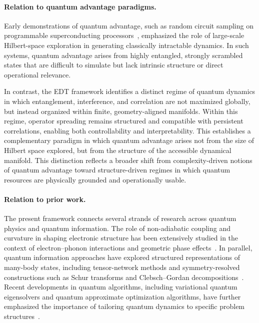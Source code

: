 \documentclass[twocolumn,10pt]{article}
\begin{document}
\paragraph*{Relation to quantum advantage paradigms.}

Early demonstrations of quantum advantage, such as random circuit sampling on programmable superconducting processors~\cite{Arute2019}, emphasized the role of large-scale Hilbert-space exploration in generating classically intractable dynamics. In such systems, quantum advantage arises from highly entangled, strongly scrambled states that are difficult to simulate but lack intrinsic structure or direct operational relevance.

In contrast, the EDT framework identifies a distinct regime of quantum dynamics in which entanglement, interference, and correlation are not maximized globally, but instead organized within finite, geometry-aligned manifolds. Within this regime, operator spreading remains structured and compatible with persistent correlations, enabling both controllability and interpretability. This establishes a complementary paradigm in which quantum advantage arises not from the size of Hilbert space explored, but from the structure of the accessible dynamical manifold. This distinction reflects a broader shift from complexity-driven notions of quantum advantage toward structure-driven regimes in which quantum resources are physically grounded and operationally usable.

\paragraph*{Relation to prior work.}

The present framework connects several strands of research across quantum physics and quantum information. The role of non-adiabatic coupling and curvature in shaping electronic structure has been extensively studied in the context of electron--phonon interactions and geometric phase effects~\cite{Mead1979,Yarkony1996,Giustino2017}. In parallel, quantum information approaches have explored structured representations of many-body states, including tensor-network methods and symmetry-resolved constructions such as Schur transforms and Clebsch--Gordan decompositions~\cite{Schollwock2011,Bacon2006}. Recent developments in quantum algorithms, including variational quantum eigensolvers and quantum approximate optimization algorithms, have further emphasized the importance of tailoring quantum dynamics to specific problem structures~\cite{Peruzzo2014,Farhi2014}.
\end{document}
